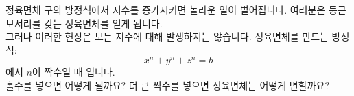 ﻿\begin{surferPage}{정육면체}
구의 방정식에서 지수를 증가시키면 놀라운 일이 벌어집니다. 여러분은 둥근 모서리를 갖는 정육면체를 얻게 됩니다.\\
\vspace{0.3cm}
그러나 이러한 현상은 모든 지수에 대해 발생하지는 않습니다. 정육면체를 만드는 방정식:
\[x^n+y^n+z^n=b\]
에서 $n$이 짝수일 때 입니다.\\
\vspace{0.3cm}
홀수를 넣으면 어떻게 될까요? 더 큰 짝수를 넣으면 정육면체는 어떻게 변할까요?
\end{surferPage}

